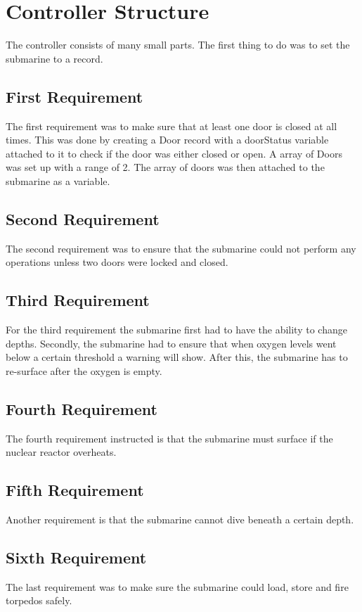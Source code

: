 \section{Controller Structure}
The controller consists of many small parts. The first thing to do was to set the submarine to a record.

\subsection{First Requirement}
The first requirement was to make sure that at least one door is closed at all times. This was done by creating a Door record with a doorStatus variable attached to it to check if the door was either closed or open. A array of Doors was set up with a range of 2. The array of doors was then attached to the submarine as a variable.    

\subsection{Second Requirement}
The second requirement was to ensure that the submarine could not perform any operations unless two doors were locked and closed.

\subsection{Third Requirement}
For the third requirement the submarine first had to have the ability to change depths. Secondly, the submarine had to ensure that when oxygen levels went below a certain threshold a warning will show. After this, the submarine has to re-surface after the oxygen is empty. 

\subsection{Fourth Requirement}
The fourth requirement instructed is that the submarine must surface if the nuclear reactor overheats. 

\subsection{Fifth Requirement}
Another requirement is that the submarine cannot dive beneath a certain depth.

\subsection{Sixth Requirement}
The last requirement was to make sure the submarine could load, store and fire torpedos safely.
